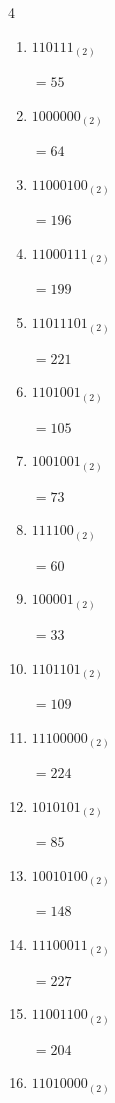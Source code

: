 \begin{multicols}{4}
\begin{enumerate}
        $=71$

  \item $110111_{(2)}$

        $=55$

  \item $1000000_{(2)}$

        $=64$

  \item $11000100_{(2)}$

        $=196$

  \item $11000111_{(2)}$

        $=199$

  \item $11011101_{(2)}$

        $=221$

  \item $1101001_{(2)}$

        $=105$

  \item $1001001_{(2)}$

        $=73$

  \item $111100_{(2)}$

        $=60$

  \item $100001_{(2)}$

        $=33$

  \item $1101101_{(2)}$

        $=109$

\columnbreak %

  \item $11100000_{(2)}$

        $=224$

  \item $1010101_{(2)}$

        $=85$

  \item $10010100_{(2)}$

        $=148$

  \item $11100011_{(2)}$

        $=227$

  \item $11001100_{(2)}$

        $=204$

  \item $11010000_{(2)}$


\end{enumerate}
\end{multicols}
